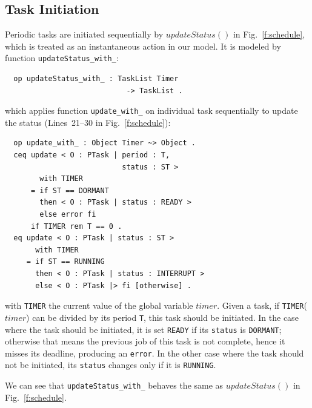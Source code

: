 \documentclass[journal]{IEEEtranTIE}
\begin{document}
\subsection{Task Initiation}
\label{ss:init}
Periodic tasks are initiated sequentially by $\mathit{updateStatus()}$
in Fig.~\ref{f:schedule}, which is treated as an instantaneous action
in our model. It is modeled by function \verb|updateStatus_with_|:
\begin{verbatim}
  op updateStatus_with_ : TaskList Timer 
                            -> TaskList . 
\end{verbatim}
which applies function \verb|update_with_| on individual task
sequentially to update the status (Lines~21--30 in
Fig.~\ref{f:schedule}):
\begin{verbatim}
  op update_with_ : Object Timer ~> Object .
  ceq update < O : PTask | period : T, 
                           status : ST > 
        with TIMER
      = if ST == DORMANT 
        then < O : PTask | status : READY >
        else error fi
      if TIMER rem T == 0 .
  eq update < O : PTask | status : ST > 
       with TIMER
     = if ST == RUNNING 
       then < O : PTask | status : INTERRUPT >
       else < O : PTask |> fi [otherwise] .
\end{verbatim}
with \verb|TIMER| the current value of the global variable $\mathit{timer}$.
Given a task, if \verb|TIMER|($\mathit{timer}$) can be divided by its period
\verb|T|, this task should be initiated.  In the case where the task
should be initiated, it is set \verb|READY| if its \verb|status| is
\verb|DORMANT|; otherwise that means the previous job of this task is
not complete, hence it misses its deadline, producing an
\verb|error|. In the other case where the task should not be
initiated, its \verb|status| changes only if it is \verb|RUNNING|.

We can see that \verb|updateStatus_with_| behaves the same as
$\mathit{updateStatus()}$ in Fig.~\ref{f:schedule}.
\end{document}
